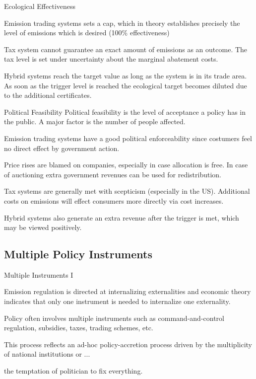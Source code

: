 {Ecological Effectiveness}
\item<1-> Emission trading systems sets a cap, which in theory establishes precisely the level of emissions which is desired (100\% effectiveness)
\item<2-> Tax system cannot guarantee an exact amount of emissions as an  outcome. The tax level is set under uncertainty about the marginal abatement costs.
\item<3-> Hybrid systems reach the target value as long as the system is in its trade area. As soon as the trigger level is reached the ecological target becomes diluted due to the additional certificates.

{Political Feasibility}
Political feasibility is the level of acceptance a policy has in the public. A major factor is the number of people affected.
\item<1-> Emission trading systems have a good political enforceability since costumers feel no direct effect by government action.
\item<2-> Price rises are blamed on companies, especially in case allocation is free. In case of auctioning extra government revenues can be used for redistribution.
\item<3-> Tax systems are generally met with scepticism (especially in the US). Additional costs on emissions will effect consumers more directly via cost increases.
\item<4-> Hybrid systems also generate an extra revenue after the trigger is met, which may be viewed positively.

\subsection{Multiple Policy Instruments}

{Multiple Instruments I}
\item<1-> Emission regulation is directed at internalizing externalities and economic theory indicates that only one instrument is needed to
internalize one externality.
\item<2-> Policy often involves multiple instruments such as command-and-control regulation, subsidies, taxes, trading schemes, etc.
\item<3-> This process reflects an ad-hoc policy-accretion process driven by the multiplicity of national institutions or ...
\item<4-> the temptation of politician to fix everything.

